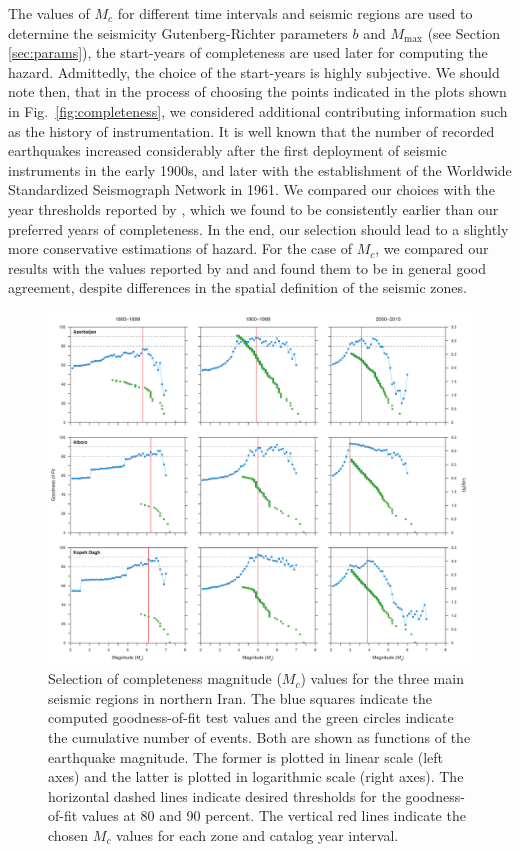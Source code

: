 The values of $M_c$ for different time intervals and seismic regions are used to determine the seismicity Gutenberg-Richter parameters $b$ and $M_{\max}$ (see Section \ref{sec:params}),  the start-years of completeness are used later for computing the hazard. Admittedly, the choice of the start-years is highly subjective. We should note then, that in the process of choosing the points indicated in the plots shown in Fig.~\ref{fig:completeness}, we considered additional contributing information such as the history of instrumentation. It is well known that the number of recorded earthquakes increased considerably after the first deployment of seismic instruments in the early 1900s, and later with the establishment of the Worldwide Standardized Seismograph Network in 1961. We compared our choices with the year thresholds reported by \citet{Zare2014}, which we found to be consistently earlier than our preferred years of completeness. In the end, our selection should lead to a slightly more conservative estimations of hazard. For the case of $M_c$, we compared our results with the values reported by \citet{Karimiparidari2013} and \citet{Khodaverdian_2016_BSSA} and found them to be in general good agreement, despite differences in the spatial definition of the seismic zones.

\begin{figure}[t]
    \centering
    \includegraphics[width=\textwidth]{figures/pdf/figure-06.pdf}
    \caption{Selection of completeness magnitude ($M_c$) values for the three main seismic regions in northern Iran. The blue squares indicate the computed goodness-of-fit test values and the green circles indicate the cumulative number of events. Both are shown as functions of the earthquake magnitude. The former is plotted in linear scale (left axes) and the latter is plotted in logarithmic scale (right axes). The horizontal dashed lines indicate desired thresholds for the goodness-of-fit values at 80 and 90 percent. The vertical red lines indicate the chosen $M_c$ values for each zone and catalog year interval.}
    \label{fig:mc}
\end{figure}

